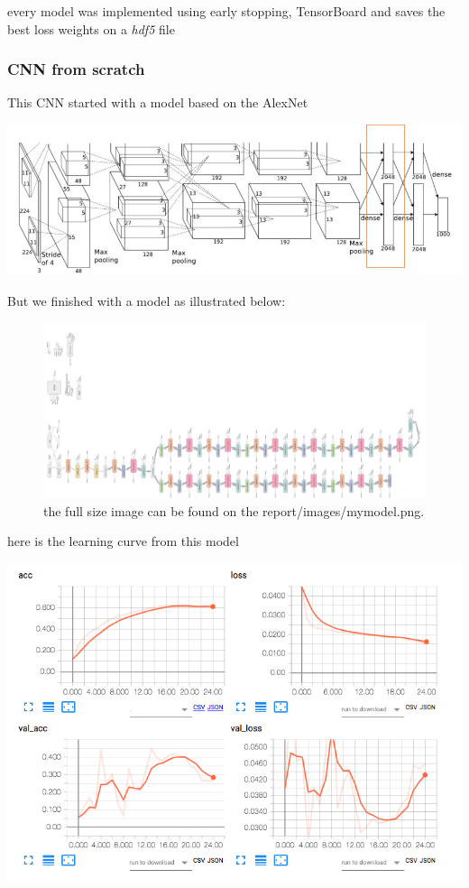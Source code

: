 \documentclass[11pt]{article}
\begin{document}
every model was implemented using early stopping, TensorBoard and saves the
best loss weights on a \emph{hdf5} file   


\pagebreak

\subsubsection{CNN from scratch}
\label{sec:org046c0e7}

This CNN started with a model based on the AlexNet \cite{krizhevsky2012imagenet} 
\begin{center}
\includegraphics[width=.9\linewidth]{./images/alexnet6.jpg}
\end{center}
But we finished with a model as illustrated below:
\begin{figure}[htbp]
\centering
\includegraphics[width=.9\linewidth]{./images/mymodel.png}
\caption{the full size image can be found on the report/images/mymodel.png.}
\end{figure}

here is the learning curve from this model
\begin{center}
\includegraphics[width=.9\linewidth]{./images/mymodelLoss.png}
\end{center}
\end{document}
